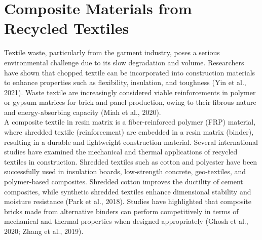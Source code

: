 \section{Composite Materials from Recycled Textiles}

Textile waste, particularly from the garment industry, poses a serious environmental challenge due to its slow degradation and volume. Researchers have shown that chopped textile can be incorporated into construction materials to enhance properties such as flexibility, insulation, and toughness (Yin et al., 2021). Waste textile are increasingly considered viable reinforcements in polymer or gypsum matrices for brick and panel production, owing to their fibrous nature and energy-absorbing capacity (Miah et al., 2020). \\

\noindent A composite textile in resin matrix is a fiber-reinforced polymer (FRP) material, where shredded textile (reinforcement) are embedded in a resin matrix (binder), resulting in a durable and lightweight construction material. Several international studies have examined the mechanical and thermal applications of recycled textiles in construction. Shredded textiles such as cotton and polyester have been successfully used in insulation boards, low-strength concrete, geo-textiles, and polymer-based composites. Shredded cotton improves the ductility of cement composites, while synthetic shredded textiles enhance dimensional stability and moisture resistance (Park et al., 2018). Studies have highlighted that composite bricks made from alternative binders can perform competitively in terms of mechanical and thermal properties when designed appropriately (Ghosh et al., 2020; Zhang et al., 2019). 